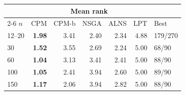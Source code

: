 \begin{tabular}{@{}lrrrrrl@{}}
\toprule
 & \multicolumn{5}{c}{Mean rank} & \\
\cmidrule(lr){2-6}
$n$ & CPM & CPM-b & NSGA & ALNS & LPT & Best \\
\midrule
12--20 & \textbf{1.98} & 3.41 & 2.40 & 2.34 & 4.88 & 179/270 \\
30 & \textbf{1.52} & 3.55 & 2.69 & 2.24 & 5.00 & 68/90 \\
60 & \textbf{1.04} & 3.13 & 3.41 & 2.41 & 5.00 & 88/90 \\
100 & \textbf{1.05} & 2.41 & 3.94 & 2.60 & 5.00 & 89/90 \\
150 & \textbf{1.17} & 2.06 & 3.94 & 2.82 & 5.00 & 88/90 \\
\bottomrule
\end{tabular}
